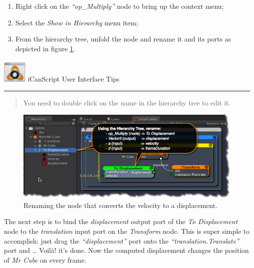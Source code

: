 \begin{enumerate}
\item Right click on the \emph{``op\_Multiply''} node to bring up the context menu;

\item Select the \emph{Show in Hierarchy} menu item;

\item From the hierarchy tree, unfold the node and rename it and its ports as depicted in figure \ref{renaming-to-displacement-node.png}.

\end{enumerate}
\begin{tipbox}

\includegraphics[width=33pt,height=33pt]{icanscript-ui-tips_32x32x32.png} {\Large \color{black} iCanScript User Interface Tips }

\begin{center}\rule{\textwidth}{0.4pt}\end{center}

\begin{quote}

You need to double click on the name in the hierarchy tree to edit it.
\end{quote}

\end{tipbox}



\begin{figure}[htbp]
\centering
\includegraphics[keepaspectratio,width=\textwidth,height=0.75\textheight]{renaming-to-displacement-node.png}
\caption{Renaming the node that converts the velocity to a displacement.}
\label{renaming-to-displacement-node.png}
\end{figure}

The next step is to bind the \emph{displacement} output port of the \emph{To Displacement} node to the \emph{translation} input port on the \emph{Transform} node. This is super simple to accomplish: just drag the \emph{``displacement''} port onto the \emph{``translation.Translate''} port and {\ldots} Voilà! it's done. Now the computed displacement changes the position of \emph{Mr Cube} on every frame.

